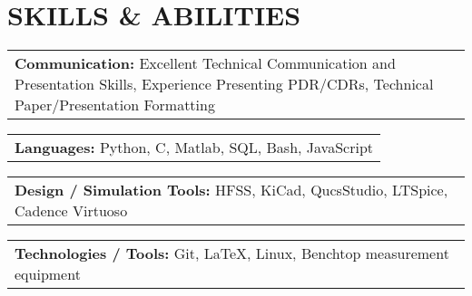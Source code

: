 \documentclass[11pt,a4paper]{article}
\newcommand{\skill}[2]{
  \begin{tabularx}{\textwidth}{
    X
    }
    \textbf{#1:} #2
  \end{tabularx}
}
\begin{document}
\vspace{-0.5cm}

\section*{SKILLS \& ABILITIES}
\vspace{-0.2cm}
\skill{Communication}
{Excellent Technical Communication and Presentation Skills, Experience Presenting PDR/CDRs, Technical Paper/Presentation Formatting}
\skill{Languages}
{Python, C, Matlab, SQL, Bash, JavaScript}
\skill{Design / Simulation Tools}
{HFSS, KiCad, QucsStudio, LTSpice, Cadence Virtuoso}
\skill{Technologies / Tools}
{Git, \LaTeX, Linux, Benchtop measurement equipment}
\end{document}
